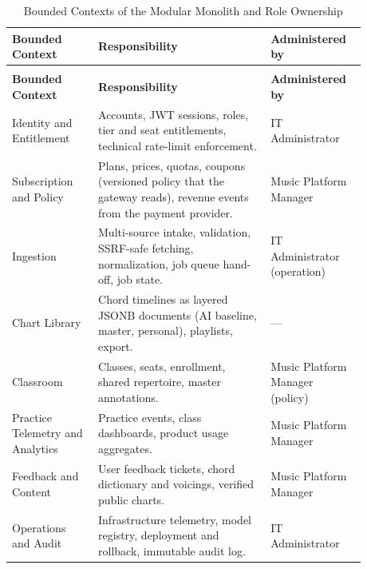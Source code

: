 \documentclass[a4paper]{article}
\begin{document}
\begin{longtable}{@{}
    >{\raggedright\arraybackslash}p{0.22\linewidth}
    >{\raggedright\arraybackslash}p{0.44\linewidth}
    >{\raggedright\arraybackslash}p{0.22\linewidth}@{}}

    \caption{Bounded Contexts of the Modular Monolith and Role Ownership}\label{tab:gateway_contexts} \\
    \toprule
    \textbf{Bounded Context} & \textbf{Responsibility} & \textbf{Administered by} \\
    \midrule
    \endfirsthead
    \multicolumn{3}{l}{\footnotesize\itshape (Table~\ref{tab:gateway_contexts} continued)}\\
    \toprule
    \textbf{Bounded Context} & \textbf{Responsibility} & \textbf{Administered by} \\
    \midrule
    \endhead
    \bottomrule
    \endlastfoot

    Identity and Entitlement & Accounts, JWT sessions, roles, tier and seat entitlements, technical rate-limit enforcement. & IT Administrator \\
    \addlinespace
    Subscription and Policy & Plans, prices, quotas, coupons (versioned policy that the gateway reads), revenue events from the payment provider. & Music Platform Manager \\
    \addlinespace
    Ingestion & Multi-source intake, validation, SSRF-safe fetching, normalization, job queue hand-off, job state. & IT Administrator (operation) \\
    \addlinespace
    Chart Library & Chord timelines as layered JSONB documents (AI baseline, master, personal), playlists, export. & --- \\
    \addlinespace
    Classroom & Classes, seats, enrollment, shared repertoire, master annotations. & Music Platform Manager (policy) \\
    \addlinespace
    Practice Telemetry and Analytics & Practice events, class dashboards, product usage aggregates. & Music Platform Manager \\
    \addlinespace
    Feedback and Content & User feedback tickets, chord dictionary and voicings, verified public charts. & Music Platform Manager \\
    \addlinespace
    Operations and Audit & Infrastructure telemetry, model registry, deployment and rollback, immutable audit log. & IT Administrator \\
\end{longtable}
\end{document}
